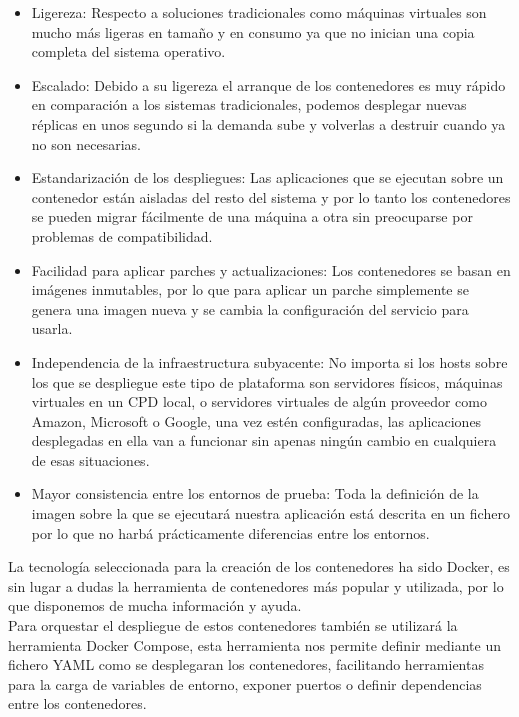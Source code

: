 \documentclass[../proyecto.tex]{subfiles}
\begin{document}
\begin{itemize}
  \item Ligereza: Respecto a soluciones tradicionales como máquinas virtuales son mucho más ligeras en tamaño y en consumo ya que no inician una copia completa del sistema operativo.
  \item Escalado: Debido a su ligereza el arranque de los contenedores es muy rápido en comparación a los sistemas tradicionales, podemos desplegar nuevas réplicas en unos segundo si la demanda sube y volverlas a destruir cuando ya no son necesarias.
  \item Estandarización de los despliegues: Las aplicaciones que se ejecutan sobre un contenedor están aisladas del resto del sistema y por lo tanto los contenedores se pueden migrar fácilmente de una máquina a otra sin preocuparse por problemas de compatibilidad.
  \item Facilidad para aplicar parches y actualizaciones: Los contenedores se basan en imágenes inmutables, por lo que para aplicar un parche simplemente se genera una imagen nueva y se cambia la configuración del servicio para usarla.
  \item Independencia de la infraestructura subyacente: No importa si los hosts sobre los que se despliegue este tipo de plataforma son servidores físicos, máquinas virtuales en un CPD local, o servidores virtuales de algún proveedor como Amazon, Microsoft o Google, una vez estén configuradas, las aplicaciones desplegadas en ella van a funcionar sin apenas ningún cambio en cualquiera de esas situaciones.
  \item Mayor consistencia entre los entornos de prueba: Toda la definición de la imagen sobre la que se ejecutará nuestra aplicación está descrita en un fichero por lo que no harbá prácticamente diferencias entre los entornos.
\end{itemize}

La tecnología seleccionada para la creación de los contenedores ha sido Docker, es sin lugar a dudas la herramienta de contenedores más popular y utilizada, por lo que disponemos de mucha información y ayuda.\\

Para orquestar el despliegue de estos contenedores también se utilizará la herramienta Docker Compose, esta herramienta nos permite definir mediante un fichero YAML como se desplegaran los contenedores, facilitando herramientas para la carga de variables de entorno, exponer puertos o definir dependencias entre los contenedores.\\
\end{document}
